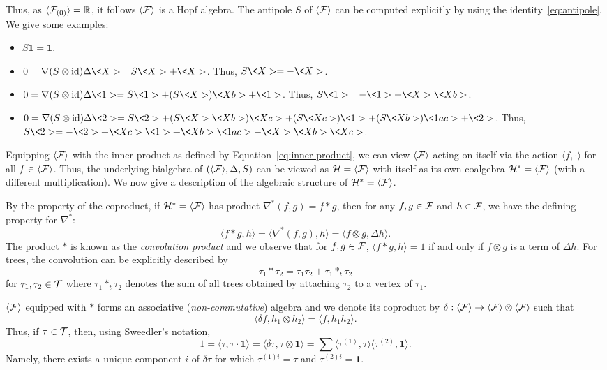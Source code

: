 \documentclass[11pt]{style/preprint}
\begin{document}
Thus, as \(\langle {\mathcal F}_{(0)}\rangle = \mathbb{R}\), it follows \(\langle {\mathcal F}\rangle\) is a Hopf algebra.
The antipole \(S\) of \(\langle {\mathcal F}\rangle\) can be computed explicitly by using the identity~\eqref{eq:antipole}. 
We give some examples:
\begin{itemize}
  \item \(S \mathbf{1} = \mathbf{1}\).
  \item \(0 = \nabla (S \otimes \text{id}) \Delta \<X> = S \<X> + \<X>\). Thus, \(S \<X> = -\<X>\).
  \item \(0 = \nabla (S \otimes \text{id}) \Delta \<1> = S \<1> + (S \<X>) \<Xb> + \<1>\). 
    Thus, \(S \<1> = -\<1> + \<X> \<Xb>\).
  \item \(0 = \nabla (S \otimes \text{id}) \Delta \<2> = S \<2> + (S \<X> \<Xb>) \<Xc> + (S \<Xc>) \<1> + (S \<Xb>) \<1ac> + \<2>\).
    Thus, \(S \<2> = -\<2> + \<Xc> \<1> + \<Xb> \<1ac> - \<X> \<Xb> \<Xc>\).
\end{itemize}

Equipping \(\langle {\mathcal F} \rangle\) with the inner product as defined by Equation~\eqref{eq:inner-product}, 
we can view \(\langle {\mathcal F} \rangle\) acting on itself via the action \(\langle f, \cdot \rangle\) 
for all \(f \in \langle {\mathcal F} \rangle\). Thus, the underlying bialgebra of \((\langle {\mathcal F} \rangle, \Delta, S)\) 
can be viewed as \({\mathcal H} = \langle {\mathcal F} \rangle\) with itself as its own coalgebra \({\mathcal H}^* = \langle {\mathcal F} \rangle\) 
(with a different multiplication). We now give a description of the algebraic structure of 
\({\mathcal H}^* = \langle {\mathcal F} \rangle\).

By the property of the coproduct, if \({\mathcal H}^* = \langle {\mathcal F} \rangle\) has product \(\nabla^*(f, g) = f * g\), then
for any \(f, g \in {\mathcal F}\) and \(h \in {\mathcal F}\), we have the defining property for \(\nabla^*\):
\[\langle f * g, h\rangle = \langle \nabla^*(f, g), h\rangle = \langle f \otimes g, \Delta h\rangle.\]
The product \(*\) is known as the \textit{convolution product} and we observe that for \(f, g \in {\mathcal F}\), 
\(\langle f * g, h\rangle = 1\) if and only if \(f \otimes g\) is a term of \(\Delta h\). For trees, the 
convolution can be explicitly described by
\[\tau_1 * \tau_2 = \tau_1 \tau_2 + \tau_1 *_t \tau_2\]
for \(\tau_1, \tau_2 \in {\mathcal T}\) where \(\tau_1 *_t \tau_2\) denotes the sum of all trees obtained 
by attaching \(\tau_2\) to a vertex of \(\tau_1\).

\(\langle {\mathcal F} \rangle\) equipped with \(*\) forms an associative (\textit{non-commutative}) algebra 
and we denote its coproduct by \(\delta :  \langle {\mathcal F} \rangle \to  \langle {\mathcal F} \rangle \otimes  \langle {\mathcal F} \rangle\) 
such that 
\[\langle \delta f, h_1 \otimes h_2\rangle = \langle f, h_1 h_2\rangle.\]
Thus, if \(\tau \in {\mathcal T}\), then, using Sweedler's notation,
\[1 = \langle \tau, \tau \cdot \mathbf{1}\rangle = \langle \delta \tau, \tau \otimes \mathbf{1}\rangle
  = \sum \langle \tau^{(1)}, \tau\rangle \langle \tau^{(2)}, \mathbf{1}\rangle.\]
Namely, there exists a unique component \(i\) of \(\delta \tau\) for which \(\tau^{(1)i} = \tau\) and 
\(\tau^{(2)i} = \mathbf{1}\).
\end{document}
